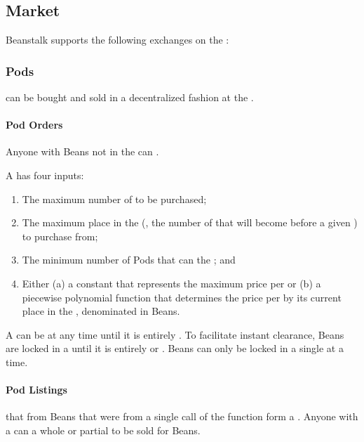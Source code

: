 \documentclass[class=article, crop=false]{standalone}
\begin{document}
\subsection{Market}
Beanstalk supports the following exchanges on the :

\subsubsection{Pods}
 can be bought and sold in a decentralized fashion at the  . 

\paragraph{Pod Orders}

Anyone with Beans not in the  can  . 

A  has four inputs:
\begin{enumerate}
        \item The maximum number of  to be purchased;
        \item The maximum place in the  (, the number of  that will become  before a given ) to purchase from;
        \item The minimum number of Pods that can  the ; and
        \item Either (a) a constant that represents the maximum price per  or (b) a piecewise polynomial function that determines the price per  by its current place in the , denominated in Beans.
\end{enumerate}

A  can be  at any time until it is entirely . To facilitate instant clearance, Beans are locked in a  until it is entirely  or . Beans can only be locked in a single  at a time.

\paragraph{Pod Listings}

 that  from Beans that were  from a single call of the  function form a . Anyone with a  can  a whole or partial  to be sold for Beans.
\end{document}
